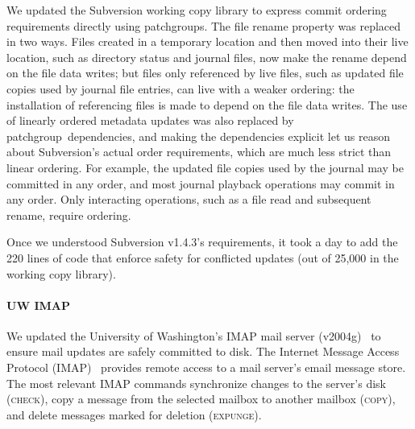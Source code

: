 \documentclass[9pt,twocolumn,letterpaper]{article}
\newcommand{\imapCheck}{{\rmfamily\scshape check}}
\newcommand{\imapCopy}{{\rmfamily\scshape copy}}
\newcommand{\imapExpunge}{{\rmfamily\scshape expunge}}
\newcommand{\patchgroup}{patchgroup}
\newcommand{\patchgroups}{patchgroups}
\newcommand{\todo}[1]{\footnote{\textbf{TODO}: #1}}
\begin{document}
We updated the Subversion working copy library to
express commit ordering requirements directly using \patchgroups.
%
The file rename property was replaced in two ways.
%
Files created in a temporary location and then moved into their
live location, such as directory status and journal files, now
make the rename depend on the file data writes; but
%
files only referenced by live files, such as updated file
copies used by journal file entries, can live with a weaker ordering:
the installation of referencing files is made to depend on the
file data writes.
%
The use of linearly ordered metadata updates was also replaced by
\patchgroup\ dependencies, and
%
making the dependencies explicit let us reason about Subversion's actual
order requirements, which are much less strict than linear ordering.
%
%
For example, the updated file copies used by the journal may be
committed in any order, and most journal playback operations
may commit in any order.
%
Only interacting operations, such as a
file read and subsequent rename, require ordering.

Once we understood Subversion v1.4.3's requirements, it took a day to add
the 220 lines of code that enforce safety for conflicted updates (out of
25,000 in the working copy library).

\paragraph{UW IMAP}
\label{sec:patchgroup:uwimap}

We updated the University of Washington's IMAP mail server
(v2004g)~\cite{uwimap} to ensure mail updates are safely committed to disk.
%
The Internet Message Access Protocol (IMAP)~\cite{rfc3501} provides
remote access to a mail server's email message store.
%
The most relevant IMAP commands synchronize changes to the server's
disk (\imapCheck), copy a message from the selected mailbox to another
mailbox (\imapCopy), and delete messages marked for deletion (\imapExpunge).
\end{document}
